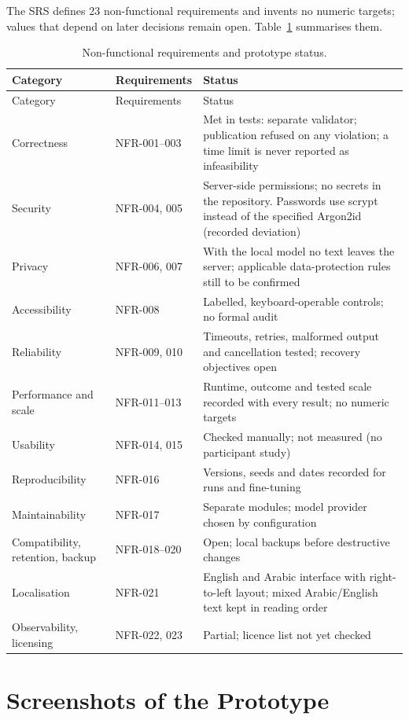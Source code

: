 The SRS defines 23 non-functional requirements and invents no numeric targets; values that depend on later decisions remain open. Table~\ref{tab:nfr} summarises them.

\begin{longtable}{@{}p{}p{}p{}@{}}
\caption{Non-functional requirements and prototype status.}\label{tab:nfr}\\
\toprule
Category & Requirements & Status \\
\midrule
\endfirsthead
\toprule
Category & Requirements & Status \\
\midrule
\endhead
Correctness & NFR-001--003 & Met in tests: separate validator; publication refused on any violation; a time limit is never reported as infeasibility \\
Security & NFR-004, 005 & Server-side permissions; no secrets in the repository. Passwords use scrypt instead of the specified Argon2id (recorded deviation) \\
Privacy & NFR-006, 007 & With the local model no text leaves the server; applicable data-protection rules still to be confirmed \\
Accessibility & NFR-008 & Labelled, keyboard-operable controls; no formal audit \\
Reliability & NFR-009, 010 & Timeouts, retries, malformed output and cancellation tested; recovery objectives open \\
Performance and scale & NFR-011--013 & Runtime, outcome and tested scale recorded with every result; no numeric targets \\
Usability & NFR-014, 015 & Checked manually; not measured (no participant study) \\
Reproducibility & NFR-016 & Versions, seeds and dates recorded for runs and fine-tuning \\
Maintainability & NFR-017 & Separate modules; model provider chosen by configuration \\
Compatibility, retention, backup & NFR-018--020 & Open; local backups before destructive changes \\
Localisation & NFR-021 & English and Arabic interface with right-to-left layout; mixed Arabic/English text kept in reading order \\
Observability, licensing & NFR-022, 023 & Partial; licence list not yet checked \\
\bottomrule
\end{longtable}

\chapter{Screenshots of the Prototype}\label{app:screenshots}

